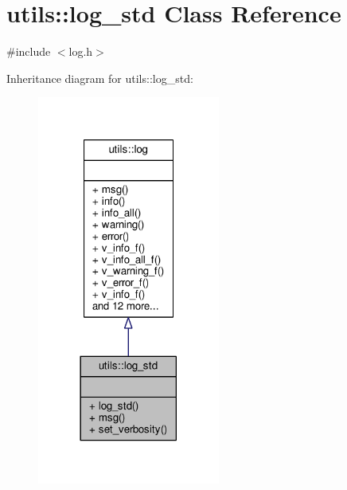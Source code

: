 \hypertarget{classutils_1_1log__std}{\section{utils\-:\-:log\-\_\-std Class Reference}
\label{classutils_1_1log__std}
}


{\ttfamily \#include $<$log.\-h$>$}



Inheritance diagram for utils\-:\-:log\-\_\-std\-:\nopagebreak
\begin{figure}[H]
\begin{center}
\leavevmode
\includegraphics[width=170pt]{classutils_1_1log__std__inherit__graph}
\end{center}
\end{figure}


